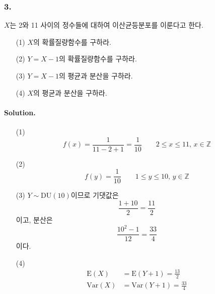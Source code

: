 \subsubsection{3.} $X$는 2와 11 사이의 정수들에 대하여 이산균등분포를 이룬다고 한다.

\begin{itemize}
	\item [(1)] $X$의 확률질량함수를 구하라.
	\item [(2)] $Y=X-1$의 확률질량함수를 구하라.
	\item [(3)] $Y=X-1$의 평균과 분산을 구하라.
    \item [(4)] $X$의 평균과 분산을 구하라.
\end{itemize}

\paragraph{Solution.}
\begin{itemize}
	\item [(1)] {
        \[f\left(x\right) = \frac{1}{11 - 2 + 1} = \frac{1}{10} \qquad 2 \leq x \leq 11,\, x \in \mathbb{Z}\]
    }
	\item [(2)] {
        \[f\left(y\right) = \frac{1}{10} \qquad 1 \leq y \leq 10,\, y \in \mathbb{Z}\]
    }
	\item [(3)] {
        $Y \sim \mathrm{DU}\left(10\right)$이므로 기댓값은 \[\frac{1 + 10}{2} = \frac{11}{2}\]이고, 분산은 \[\frac{10^2-1}{12}=\frac{33}{4}\]이다.
    }
    \item [(4)] {
        \begin{align*}
            \mathrm{E}\left(X\right) &= \mathrm{E}\left(Y + 1\right) = \frac{13}{2} \\
            \mathrm{Var}\left(X\right) &= \mathrm{Var}\left(Y + 1\right) = \frac{33}{4}
        \end{align*}
    }
\end{itemize}
